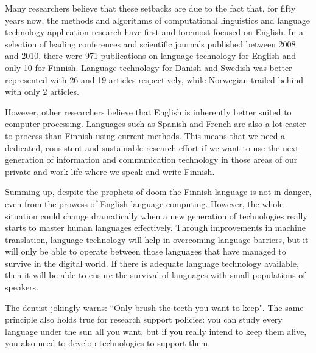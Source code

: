\begin{multicols}{2}
Many researchers believe that these setbacks are due to the fact that, for fifty years now, the methods and algorithms of computational linguistics and language technology application research have first and foremost focused on English. In a selection of leading conferences and scientific journals published between 2008 and 2010, there were 971 publications on language technology for English and only 10 for Finnish. Language technology for Danish and Swedish was better represented with 26 and 19 articles respectively, while Norwegian trailed behind with only 2 articles.
 
However, other researchers believe that English is inherently better suited to computer processing. Languages such as Spanish and French are also a lot easier to process than Finnish using current methods. This means that we need a dedicated, consistent and sustainable research effort if we want to use the next generation of information and communication technology in those areas of our private and work life where we speak and write Finnish.

Summing up, despite the prophets of doom the Finnish language is not in danger, even from the prowess of English language computing. However, the whole situation could change dramatically when a new generation of technologies really starts to master human languages effectively. Through improvements in machine translation, language technology will help in overcoming language barriers, but it will only be able to operate between those languages that have managed to survive in the digital world. If there is adequate language technology available, then it will be able to ensure the survival of languages with small populations of speakers.


The dentist jokingly warns: ``Only brush the teeth you want to keep".
The same principle also holds true for research support policies: you can study every language under the sun all you want, but if you really
intend to keep them alive, you also need to develop technologies to support them.


\end{multicols}
